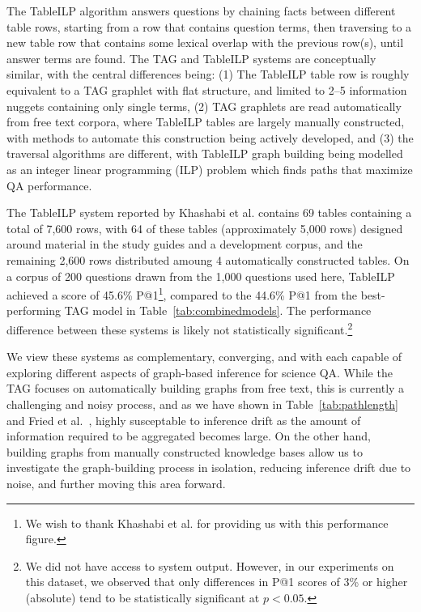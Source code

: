 The TableILP algorithm answers questions by chaining facts between different table rows, starting from a row that contains question terms, then traversing to a new table row that contains some lexical overlap with the previous row(s), until answer terms are found.  The TAG and TableILP systems are conceptually similar, with the central differences being: (1) The TableILP table row is roughly equivalent to a TAG graphlet with flat structure, and limited to 2--5 information nuggets containing only single terms, (2) TAG graphlets are read automatically from free text corpora, where TableILP tables are largely manually constructed, with methods to automate this construction being actively developed, and (3) the traversal algorithms are different, with TableILP graph building being modelled as an integer linear programming (ILP) problem which finds paths that maximize QA performance.  

The TableILP system reported by Khashabi et al. \citeyear{Khashabi2016QuestionAV} contains 69 tables containing a total of 7,600 rows, with 64 of these tables (approximately 5,000 rows) designed around material in the study guides and a development corpus, and the remaining 2,600 rows distributed amoung 4 automatically constructed tables.  On a corpus of 200 questions drawn from the 1,000 questions used here, TableILP achieved a score of 45.6\% P@1\footnote{We wish to thank Khashabi et al. \citeyear{Khashabi2016QuestionAV} for providing us with this performance figure.}, compared to the 44.6\% P@1 from the best-performing TAG model in Table~\ref{tab:combinedmodels}. The performance difference between these systems is likely not statistically significant.\footnote{We did not have access to system output. However, in our experiments on this dataset, we observed that only differences in P@1 scores of 3\% or higher (absolute) tend to be statistically significant at $p < 0.05$.}

We view these systems as complementary, converging, and with each capable of exploring different aspects of graph-based inference for science QA.  While the TAG focuses on automatically building graphs from free text, this is currently a challenging and noisy process, and as we have shown in Table~\ref{tab:pathlength} and Fried et al.~\citeyear{fried2015higher}, highly susceptable to inference drift as the amount of information required to be aggregated becomes large.  On the other hand, building graphs from manually constructed knowledge bases allow us to investigate the graph-building process in isolation, reducing inference drift due to noise, and further moving this area forward.  

